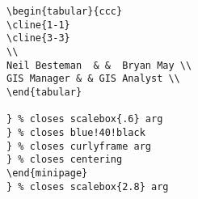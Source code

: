 \clearpage

\begin{verbatim}
\begin{tabular}{ccc}
\cline{1-1}
\cline{3-3}
\\
Neil Besteman  & &  Bryan May \\
GIS Manager & & GIS Analyst \\
\end{tabular}

} % closes scalebox{.6} arg
} % closes blue!40!black
} % closes curlyframe arg
} % closes centering
\end{minipage}
} % closes scalebox{2.8} arg


\end{verbatim}
\clearpage


